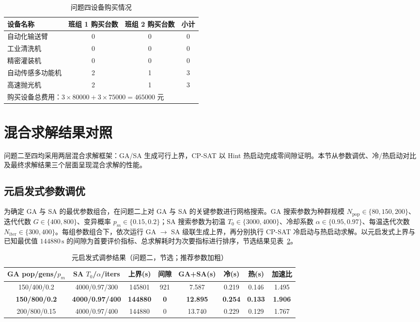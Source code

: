 \documentclass[12pt,a4paper]{ctexart}
\begin{document}
\begin{table}[H]
\centering
\caption{问题四设备购买情况}\label{tab:q5}
\begin{tabular}{l c c c}
\toprule
设备名称 & 班组 1 购买台数 & 班组 2 购买台数 & 小计 \\
\midrule
自动化输送臂 & 0 & 0 & 0 \\
工业清洗机 & 0 & 0 & 0 \\
精密灌装机 & 0 & 0 & 0 \\
自动传感多功能机 & 2 & 1 & 3 \\
高速抛光机 & 2 & 1 & 3 \\
\midrule
\multicolumn{4}{l}{购买设备总费用：$3\times80000+3\times75000=465000$ 元} \\
\bottomrule
\end{tabular}
\end{table}

\section{混合求解结果对照}\label{sec:cv}

问题二至四均采用两层混合求解框架：GA/SA 生成可行上界，CP-SAT 以 Hint 热启动完成零间隙证明。本节从参数调优、冷/热启动对比及最终求解结果三个层面呈现混合求解的性能。

\subsection{元启发式参数调优}

为确定 GA 与 SA 的最优参数组合，在问题二上对 GA 与 SA 的关键参数进行网格搜索。GA 搜索参数为种群规模 $N_{\mathrm{pop}}\in\{80,150,200\}$、迭代代数 $G\in\{400,800\}$、变异概率 $p_m\in\{0.15,0.2\}$；SA 搜索参数为初温 $T_0\in\{3000,4000\}$、冷却系数 $\alpha\in\{0.95,0.97\}$、每温迭代次数 $N_{\mathrm{iter}}\in\{300,400\}$。每组参数组合下，依次运行 GA $\rightarrow$ SA 级联生成上界，再分别执行 CP-SAT 冷启动与热启动求解。以元启发式上界与已知最优值 $144880\,\mathrm{s}$ 的间隙为首要评价指标、总求解耗时为次要指标进行排序，节选结果见表~\ref{tab:tune}。

\begin{table}[H]
\centering
\caption{元启发式调参结果（问题二，节选；推荐参数加粗）}\label{tab:tune}
\small
\begin{tabular}{c c c c c c c c}
\toprule
GA pop/gens/$p_m$ & SA $T_0$/$\alpha$/iters & 上界(s) & 间隙 & GA+SA(s) & 冷(s) & 热(s) & 加速比 \\
\midrule
150/400/0.2 & 4000/0.97/300 & 145801 & 921 & 7.587 & 0.219 & 0.146 & 1.495 \\
\textbf{150/800/0.2} & \textbf{4000/0.97/400} & \textbf{144880} & \textbf{0} & \textbf{12.895} & \textbf{0.254} & \textbf{0.133} & \textbf{1.906} \\
200/800/0.15 & 4000/0.97/400 & 144880 & 0 & 13.740 & 0.229 & 0.129 & 1.767 \\
\bottomrule
\end{tabular}
\end{table}
\end{document}
